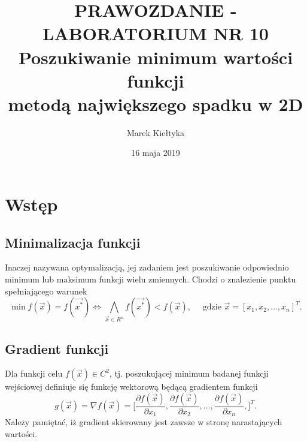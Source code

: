 

\renewcommand{\arraystretch}{1.2}

\title{\Large\vspace{-2.5cm}{\Huge S}PRAWOZDANIE - LABORATORIUM NR {\Huge10}\\
	\textbf{Poszukiwanie minimum wartości funkcji\\ metodą największego spadku w 2D} } 
\date{\Large16 maja 2019}
\author{\Large Marek Kiełtyka}


\maketitle

\vspace{-1.2cm}\section{Wstęp}

\subsection{Minimalizacja funkcji}
Inaczej nazywana optymalizacją, jej zadaniem jest poszukiwanie odpowiednio minimum lub maksimum funkcji wielu zmiennych. Chodzi o znalezienie punktu spełniającego warunek
\begin{equation}
\min f(\vec{x}) = f(\vec{x^{*}}) \Leftrightarrow \bigwedge_{\vec{x} \in R^n} f(\vec{x^{*}}) < f(\vec{x}), \quad \text{ gdzie } \vec{x} = [x_1, x_2, \dots, x_n]^{T}.
\end{equation}
\subsection{Gradient funkcji}
Dla funkcji celu $f(\vec{x}) \in C^2$, tj. poszukującej minimum badanej funkcji wejściowej definiuje się funkcję wektorową będącą gradientem funkcji
\begin{equation}
g(\vec{x}) = \nabla f(\vec{x}) = \bigg[ \frac{\partial f(\vec{x})}{\partial x_1}, \frac{\partial f(\vec{x})}{\partial x_2}, \dots, \frac{\partial f(\vec{x})}{\partial x_n}, \bigg]^{T}.
\end{equation}
Należy pamiętać, iż gradient skierowany jest zawsze w stronę narastających wartości.
